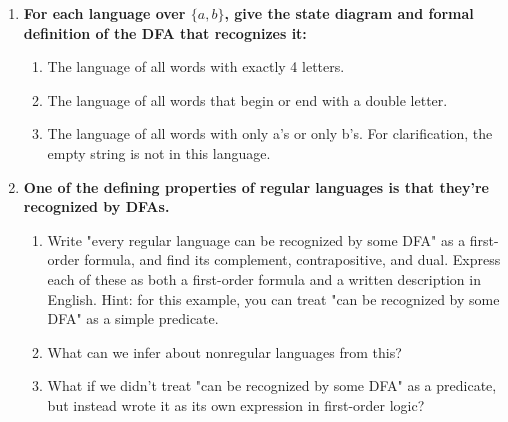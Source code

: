 \begin{enumerate}
\newpage
\item \textbf{For each language over $\{a,b\}$, give the state diagram and formal definition of the DFA that recognizes it:}
\begin{enumerate}
  \item The language of all words with exactly 4 letters.
  \item The language of all words that begin or end with a double letter.
  \item The language of all words with only a's or only b's. For clarification, the empty string is not in this language.
\end{enumerate}


\newpage
\item \textbf{One of the defining properties of regular languages is that they're recognized by DFAs.}
\begin{enumerate}
  \item Write "every regular language can be recognized by some DFA" as a first-order formula, and find its complement, contrapositive, and dual. Express each of these as both a first-order formula and a written description in English. Hint: for this example, you can treat "can be recognized by some DFA" as a simple predicate.
  \item What can we infer about nonregular languages from this?
  \item What if we didn't treat "can be recognized by some DFA" as a predicate, but instead wrote it as its own expression in first-order logic?
\end{enumerate}
		
\end{enumerate}


